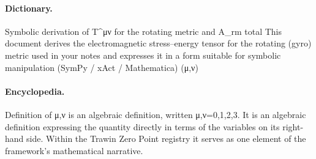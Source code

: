 \paragraph{Dictionary.}
Symbolic derivation of T\textasciicircum{}μν for the rotating metric and A\_rm total This document derives the electromagnetic stress–energy tensor for the rotating (gyro) metric used in your notes and expresses it in a form suitable for symbolic manipulation (SymPy / xAct / Mathematica) (μ,ν)

\paragraph{Encyclopedia.}
Definition of μ,ν is an algebraic definition, written μ,ν=0,1,2,3. It is an algebraic definition expressing the quantity directly in terms of the variables on its right-hand side. Within the Trawin Zero Point registry it serves as one element of the framework's mathematical narrative.
